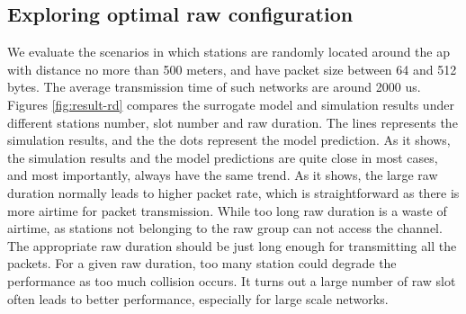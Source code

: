 \subsection{Exploring optimal \gls{raw} configuration}


We evaluate the scenarios in which stations are randomly located around the \gls{ap} with distance no more than 500 meters, and have packet size between 64 and 512 bytes. The average transmission time of such networks are around 2000 us. Figures \ref{fig:result-rd} compares the surrogate model and simulation results under different stations number, slot number and \gls{raw} duration. The lines represents the simulation results, and the the dots represent the  model prediction. As it shows, the simulation results and the model predictions are quite close in most cases, and most importantly, always have the same trend. As it shows, the large \gls{raw} duration normally leads to higher packet rate, which is straightforward as there is more airtime for packet transmission. While too long \gls{raw} duration is a waste of airtime, as stations not belonging to the \gls{raw} group can not access the channel. The appropriate \gls{raw} duration should be just long enough for transmitting all the packets. For a given \gls{raw} duration, too many station could degrade the performance as too much collision occurs.
It turns out a large number of \gls{raw} slot often leads to better performance, especially for large scale networks.



